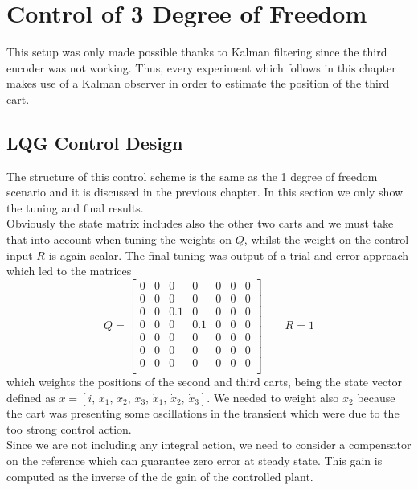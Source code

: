 \chapter{Control of 3 Degree of Freedom}
	This setup was only made possible thanks to Kalman filtering since the third encoder was not working. Thus, every experiment which follows in this chapter makes use of a Kalman observer in order to estimate the position of the third cart.
\section{LQG Control Design}

The structure of this control scheme is the same as the 1 degree of freedom scenario and it is discussed in the previous chapter. In this section we only show the tuning and final results.\\

Obviously the state matrix includes also the other two carts and we must take that into account when tuning the weights on $Q$, whilst the weight on the control input $R$ is again scalar. The final tuning was output of a trial and error approach which led to the matrices
\begin{equation}
\renewcommand{\arraystretch}{1}
Q = 
\begin{bmatrix}
0 & 0 & 0 & 0 & 0 & 0 & 0\\
0 & 0 & 0 & 0 & 0 & 0 & 0\\
0 & 0 & 0.1 & 0 & 0 & 0 & 0\\
0 & 0 & 0 & 0.1 & 0 & 0 & 0\\
0 & 0 & 0 & 0 & 0 & 0 & 0\\
0 & 0 & 0 & 0 & 0 & 0 & 0\\
0 & 0 & 0 & 0 & 0 & 0 & 0\\
\end{bmatrix}
\qquad
R=1
\end{equation}
which weights the positions of the second and third carts, being the state vector defined as $x = \left[ i,\, x_1,\, x_2,\, x_3,\, \dot{x}_1,\, \dot{x}_2,\, \dot{x}_3 \right] $. We needed to weight also $x_2$ because the cart was presenting some oscillations in the transient which were due to the too strong control action.\\

Since we are not including any integral action, we need to consider a compensator on the reference which can guarantee zero error at steady state. This gain is computed as the inverse of the dc gain of the controlled plant.

